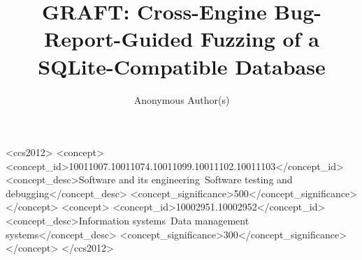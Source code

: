 \documentclass[sigconf,review,anonymous]{acmart}
\begin{document}
\title[GRAFT]{GRAFT: Cross-Engine Bug-Report-Guided Fuzzing of a SQLite-Compatible Database}

\author{Anonymous Author(s)}

\begin{abstract}

\end{abstract}

\begin{CCSXML}
<ccs2012>
  <concept>
    <concept_id>10011007.10011074.10011099.10011102.10011103</concept_id>
    <concept_desc>Software and its engineering~Software testing and debugging</concept_desc>
    <concept_significance>500</concept_significance>
  </concept>
  <concept>
    <concept_id>10002951.10002952</concept_id>
    <concept_desc>Information systems~Data management systems</concept_desc>
    <concept_significance>300</concept_significance>
  </concept>
</ccs2012>
\end{CCSXML}


\maketitle













\end{document}
